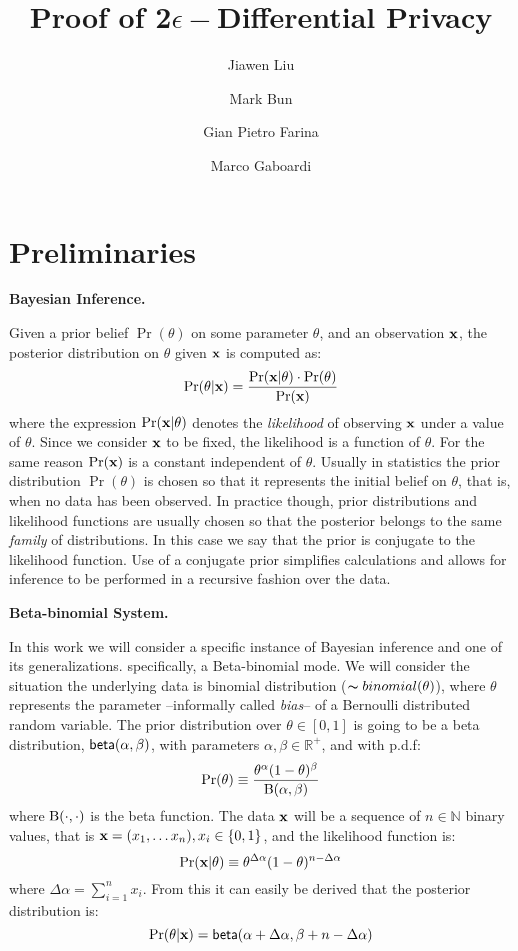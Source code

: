 \documentclass{article}
\begin{document}
\title{Proof of 2$\epsilon-$Differential Privacy}

\author[*]{Jiawen Liu}
\author[**]{Mark Bun}
\author[*]{Gian Pietro Farina}
\author[*]{Marco Gaboardi}
\date{}
\maketitle



\section{Preliminaries}
\label{sec_background}

\noindent \textbf{Bayesian Inference.}

Given a prior belief $\Pr(\theta)$ on some parameter $\theta$,
and an observation $\textbf{x}$, the posterior distribution on $\theta$ given $\textbf{x}$ is computed as:
\[
  \Pr(\theta | \textbf{x}) = \frac{\Pr(\textbf{x} | \theta) \cdot \Pr(\theta)}{\Pr(\textbf{x})}
\]
where the expression $\Pr(\textbf{x} | \theta)$ denotes the
\emph{likelihood} of observing $\textbf{x}$ under a value of
$\theta$. Since we consider $\textbf{x}$ to be fixed, the likelihood is
a function of $\theta$.
For the same reason $\Pr(\textbf{x})$ is a constant independent of $\theta$.
Usually in statistics the prior distribution $\Pr(\theta)$ is chosen so that it represents
the initial belief on $\theta$, that is, when no data has been observed. In practice though,
prior distributions and likelihood functions are usually chosen so that the posterior
belongs to the same \emph{family} of distributions. In this case we say that the prior
is conjugate to the likelihood function. Use of a conjugate prior
simplifies calculations and allows for inference to be performed in a
recursive fashion over the data.


\noindent \textbf{Beta-binomial System.}

In this work we will consider a specific instance of Bayesian inference and one of its generalizations.
specifically, a Beta-binomial mode. We will consider the situation the underlying data is binomial distribution ($\thicksim binomial(\theta)$), where $\theta$ represents
the parameter --informally called \emph{bias}-- of a Bernoulli
distributed random variable. The
prior distribution over $\theta\in [0,1]$ is going to be a beta
distribution, $\mathsf{beta}(\alpha, \beta)$, with parameters
$\alpha,\beta\in\mathbb{R}^{+}$, and with p.d.f:
\[
  \Pr(\theta)\equiv \frac{\theta^{\alpha} (1- \theta)^{\beta}}{\textup{B}(\alpha,\beta)}
\]
where $\textup{B}(\cdot,\cdot)$ is the beta function.
The data $\textbf{x}$ will be a sequence of $n\in\mathbb{N}$ binary values, that is $\textbf{x}= (x_1,\dots x_n), x_i\in\{0,1\}$, and the likelihood function is:
\[
  \Pr(\textbf{x} | \theta)\equiv \theta^{\Delta \alpha}(1-\theta)^{n - \Delta \alpha}
\]
where $\Delta \alpha = \displaystyle\sum_{i=1}^{n}x_i$.
From this it can easily be derived that the posterior distribution is:
\[
  \Pr(\theta|\textbf{x})=\mathsf{beta}(\alpha + \Delta \alpha,\beta + n - \Delta \alpha)
\]
\end{document}

